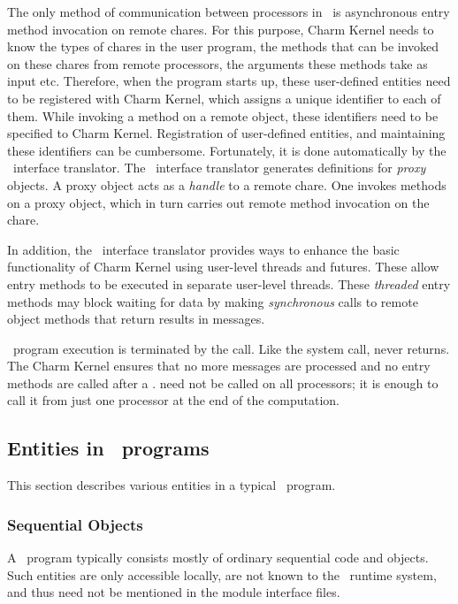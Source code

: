 The only method of communication between processors in \charmpp\ is
asynchronous  entry method invocation on remote chares.
For this purpose, Charm Kernel needs to know the types of
chares in the user program, the methods that can be invoked on
these chares from remote processors, the arguments these methods take as
input etc. Therefore, when the program starts up, these user-defined
entities need to be registered with Charm Kernel, which assigns a unique
identifier to each of them. While invoking a method on a remote object,
these identifiers need to be specified to Charm Kernel. Registration of
user-defined entities, and maintaining these identifiers can be cumbersome.
Fortunately, it is done automatically by the \charmpp\ interface translator.
The \charmpp\ interface translator generates definitions for {\em proxy}
objects. A proxy object acts as a {\em handle} to a remote chare. One
invokes methods on a proxy object, which in turn carries out remote method
invocation on the chare.

In addition, the \charmpp\ interface translator provides ways to enhance the
basic functionality of Charm Kernel using user-level threads and futures. These
allow entry methods to be executed in separate user-level threads.  These
 {\em threaded} entry methods may block waiting for data by
making {\em synchronous} calls to remote object methods that return results in
messages.

\charmpp\ program execution is terminated by the  call.  Like the
 system call,  never returns. The Charm Kernel ensures
that no more messages are processed and no entry methods are called after a
.  need not be called on all processors; it is enough
to call it from just one processor at the end of the computation.


\subsection{Entities in \charmpp\ programs}

This section describes various entities in a typical \charmpp\ program.

\subsubsection{Sequential Objects}

A \charmpp\ program typically consists mostly of ordinary sequential \CC
code and objects. Such entities are only accessible locally, are not known
to the \charmpp\ runtime system, and thus need not be mentioned in the
module interface files. 

